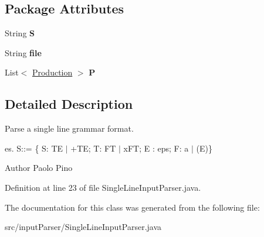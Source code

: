 \subsection*{Package Attributes}
\begin{DoxyCompactItemize}
\item 
\hypertarget{classinput_parser_1_1_single_line_input_parser_afaca00d01ba13c5fc39fe11309aba895}{String {\bfseries S}}\label{classinput_parser_1_1_single_line_input_parser_afaca00d01ba13c5fc39fe11309aba895}

\item 
\hypertarget{classinput_parser_1_1_single_line_input_parser_a46401abfc8915fde62cc6109f520028a}{String {\bfseries file}}\label{classinput_parser_1_1_single_line_input_parser_a46401abfc8915fde62cc6109f520028a}

\item 
\hypertarget{classinput_parser_1_1_single_line_input_parser_a07d3d934d89d64a72eb0a06b89e684a8}{List$<$ \hyperlink{classcontext_free_1_1grammar_1_1_production}{Production} $>$ {\bfseries P}}\label{classinput_parser_1_1_single_line_input_parser_a07d3d934d89d64a72eb0a06b89e684a8}

\end{DoxyCompactItemize}


\subsection{Detailed Description}
Parse a single line grammar format. 

es. S\-:\-:= \{ S\-: T\-E $|$ +\-T\-E; T\-: F\-T $|$ x\-F\-T; E \-: eps; F\-: a $|$ (E)\} \begin{DoxyAuthor}{Author}
Paolo Pino 
\end{DoxyAuthor}


Definition at line 23 of file Single\-Line\-Input\-Parser.\-java.



The documentation for this class was generated from the following file\-:\begin{DoxyCompactItemize}
\item 
src/input\-Parser/Single\-Line\-Input\-Parser.\-java\end{DoxyCompactItemize}
